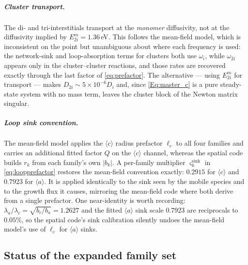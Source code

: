 \documentclass{article}
\newcommand{\aloop}{\ensuremath{\langle a\rangle}}
\newcommand{\cloop}{\ensuremath{\langle c\rangle}}
\begin{document}
\subparagraph{Cluster transport.} The di- and tri-interstitials transport at the
\emph{monomer} diffusivity, not at the diffusivity implied by
$E^m_{2i}=1.36\,$eV. This follows the mean-field model, which is inconsistent on
the point but unambiguous about where each frequency is used: the network-sink
and loop-absorption terms for clusters both use $\omega_i$, while $\omega_{2i}$
appears only in the cluster--cluster reactions, and those rates are recovered
exactly through the last factor of \cref{eq:prefactor}. The alternative --- using
$E^m_{2i}$ for transport --- makes $D_{2i}\sim5\times10^{-6}D_i$ and, since
\cref{Eq:master_c} is a pure steady-state system with no mass term, leaves the
cluster block of the Newton matrix singular.

\subparagraph{Loop sink convention.} The mean-field model applies the \cloop{}
radius prefactor $\ell_c$ to all four families and carries an additional fitted
factor $Q$ on the \cloop{} channel, whereas the spatial code builds $r_k$ from
each family's own $|b_k|$. A per-family multiplier
$\varsigma^{\mathrm{sink}}_k$ in \cref{eq:loopprefactor} restores the mean-field
convention exactly: $0.2915$ for \cloop{} and $0.7923$ for \aloop{}. It is
applied identically to the sink seen by the mobile species and to the growth flux
it causes, mirroring the mean-field code where both derive from a single
prefactor. One near-identity is worth recording: $\lambda_a/\lambda_c=
\sqrt{b_c/b_a}=1.2627$ and the fitted \aloop{} sink scale $0.7923$ are
reciprocals to $0.05\%$, so the spatial code's sink calibration silently undoes
the mean-field model's use of $\ell_c$ for \aloop{} sinks.

\subsection{Status of the expanded family set}
\label{sec:status}
\end{document}

